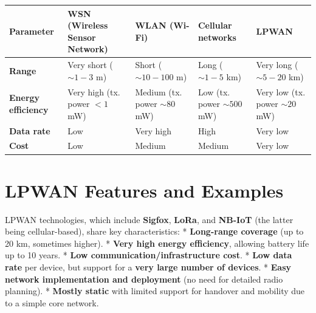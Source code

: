 \documentclass[a4paper, 12pt]{book} %
\begin{document}
\begin{longtable}[]{@{}
  >{\raggedright\arraybackslash}p{}
  >{\raggedright\arraybackslash}p{}
  >{\raggedright\arraybackslash}p{}
  >{\raggedright\arraybackslash}p{}
  >{\raggedright\arraybackslash}p{}@{}}
\toprule\noalign{}
\begin{minipage}[b]{\linewidth}\raggedright
Parameter
\end{minipage} & \begin{minipage}[b]{\linewidth}\raggedright
WSN (Wireless Sensor Network)
\end{minipage} & \begin{minipage}[b]{\linewidth}\raggedright
WLAN (Wi-Fi)
\end{minipage} & \begin{minipage}[b]{\linewidth}\raggedright
Cellular networks
\end{minipage} & \begin{minipage}[b]{\linewidth}\raggedright
LPWAN
\end{minipage} \\
\midrule\noalign{}
\endhead
\bottomrule\noalign{}
\endlastfoot
\textbf{Range} & Very short (\(\sim1-3\) m) & Short (\(\sim10-100\) m) &
Long (\(\sim1-5\) km) & Very long (\(\sim5-20\) km) \\
\textbf{Energy efficiency} & Very high (tx. power \(< 1\) mW) & Medium
(tx. power \(\sim80\) mW) & Low (tx. power \(\sim500\) mW) & Very low
(tx. power \(\sim 20\) mW) \\
\textbf{Data rate} & Low & Very high & High & Very low \\
\textbf{Cost} & Low & Medium & Medium & Very low \\
\end{longtable}

\section{LPWAN Features and Examples}\label{lpwan-features-and-examples}

LPWAN technologies, which include \textbf{Sigfox}, \textbf{LoRa}, and
\textbf{NB-IoT} (the latter being cellular-based), share key
characteristics: * \textbf{Long-range coverage} (up to 20 km, sometimes
higher). * \textbf{Very high energy efficiency}, allowing battery life
up to 10 years. * \textbf{Low communication/infrastructure cost}. *
\textbf{Low data rate} per device, but support for a \textbf{very large
number of devices}. * \textbf{Easy network implementation and
deployment} (no need for detailed radio planning). * \textbf{Mostly
static} with limited support for handover and mobility due to a simple
core network.
\end{document}
